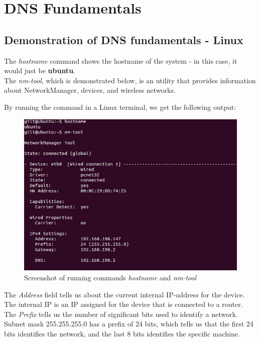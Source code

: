 \section{DNS Fundamentals}
\subsection{Demonstration of DNS fundamentals - Linux}

The \textit{hostname} command shows the hostname of the system - in this case, it would just be \textbf{ubuntu}.\\

The \textit{nm-tool}, which is demonstrated below, is an utility that provides information about NetworkManager, devices, and wireless networks. 

By running the command in a Linux terminal, we get the following output:

\begin{figure}[ht!]
\centering
\includegraphics[width=150mm]{img/nm-tool.JPG}
\caption{Screenshot of running commands \textit{hostname} and \textit{nm-tool}}
\label{nm-tool}
\end{figure}

The \textit{Address} field tells us about the current internal IP-address for the device. The internal IP is an IP assigned for the device that is connected to a router. \\

The \textit{Prefix} tells us the number of significant bits used to identify a network. Subnet mask 255.255.255.0 has a prefix of 24 bits, which tells us that the first 24 bits identifies the network, and the last 8 bits identifies the specific machine. \\

